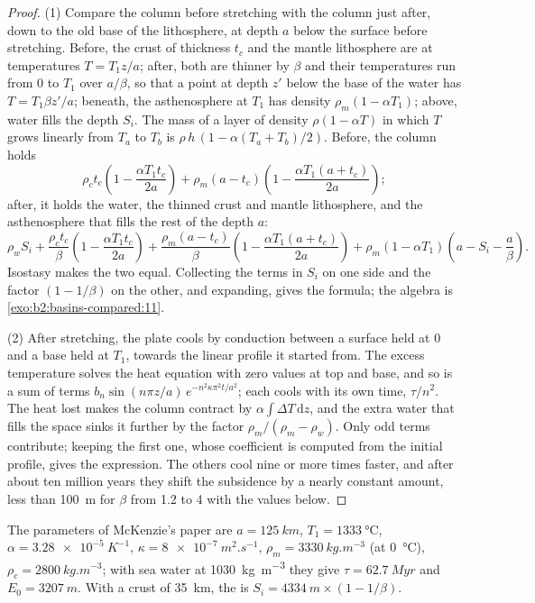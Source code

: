 \begin{proof}
(1) Compare the column before stretching with the column just after, down to the old base of
the lithosphere, at depth $a$ below the surface before stretching. Before, the crust of
thickness $t_c$ and the mantle lithosphere are at temperatures $T = T_1 z/a$; after, both are
thinner by $\beta$ and their temperatures run from $0$ to $T_1$ over $a/\beta$, so that a point
at depth $z'$ below the base of the water has $T = T_1\beta z'/a$; beneath, the asthenosphere at
$T_1$ has density $\rho_m(1 - \alpha T_1)$; above, water fills the depth $S_i$. The mass of a
layer of density $\rho(1 - \alpha T)$ in which $T$ grows linearly from $T_a$ to $T_b$ is
$\rho\,h\,(1 - \alpha(T_a + T_b)/2)$. Before, the column holds
\[
  \rho_c t_c\left(1 - \frac{\alpha T_1 t_c}{2a}\right)
  + \rho_m (a - t_c)\left(1 - \frac{\alpha T_1 (a + t_c)}{2a}\right);
\]
after, it holds the water, the thinned crust and mantle lithosphere, and the asthenosphere that
fills the rest of the depth $a$:
\[
  \rho_w S_i + \frac{\rho_c t_c}{\beta}\left(1 - \frac{\alpha T_1 t_c}{2a}\right)
  + \frac{\rho_m (a - t_c)}{\beta}\left(1 - \frac{\alpha T_1 (a + t_c)}{2a}\right)
  + \rho_m(1 - \alpha T_1)\left(a - S_i - \frac{a}{\beta}\right).
\]
Isostasy makes the two equal. Collecting the terms in $S_i$ on one side and the factor
$(1 - 1/\beta)$ on the other, and expanding, gives the formula; the algebra is
\cref{exo:b2:basins-compared:11}.

(2) After stretching, the plate cools by conduction between a surface held at $0$ and a base held
at $T_1$, towards the linear profile it started from. The excess temperature solves the heat
equation with zero values at top and base, and so is a sum of terms
$b_n\sin(n\pi z/a)\,e^{-n^2\kappa\pi^2 t/a^2}$; each cools with its own time, $\tau/n^2$. The
heat lost makes the column contract by $\alpha\int \Delta T\,\mathrm{d}z$, and the extra water
that fills the space sinks it further by the factor $\rho_m/(\rho_m - \rho_w)$. Only odd terms
contribute; keeping the first one, whose coefficient is computed from the initial profile, gives
the expression. The others cool nine or more times faster, and after about ten million years
they shift the subsidence by a nearly constant amount, less than \qty{100}{m} for $\beta$ from
1.2 to 4 with the values below.
\end{proof}

The parameters of McKenzie's paper are $a = \qty{125}{km}$, $T_1 = \qty{1333}{\celsius}$,
$\alpha = \qty{3.28e-5}{K^{-1}}$, $\kappa = \qty{8e-7}{m^2.s^{-1}}$, $\rho_m =
\qty{3330}{kg.m^{-3}}$ (at \qty{0}{\celsius}), $\rho_c = \qty{2800}{kg.m^{-3}}$; with sea water at
\qty{1030}{kg.m^{-3}} they give $\tau = \qty{62.7}{Myr}$ and $E_0 = \qty{3207}{m}$. With a crust of
\qty{35}{km}, the  is $S_i = \qty{4334}{m} \times (1 - 1/\beta)$.

